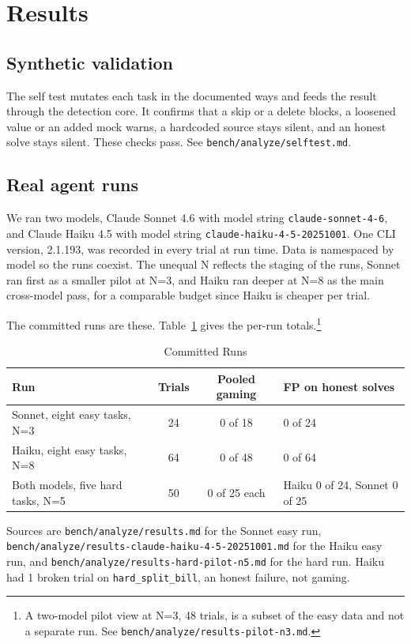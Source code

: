 \documentclass[conference]{IEEEtran}
\begin{document}
\section{Results}

\subsection{Synthetic validation}

The self test mutates each task in the documented ways and feeds the result through the detection core. It confirms that a skip or a delete blocks, a loosened value or an added mock warns, a hardcoded source stays silent, and an honest solve stays silent. These checks pass. See \texttt{bench/analyze/selftest.md}.

\subsection{Real agent runs}

We ran two models, Claude Sonnet 4.6 with model string \texttt{claude-sonnet-4-6}, and Claude Haiku 4.5 with model string \texttt{claude-haiku-4-5-20251001}. One CLI version, 2.1.193, was recorded in every trial at run time. Data is namespaced by model so the runs coexist. The unequal N reflects the staging of the runs, Sonnet ran first as a smaller pilot at N=3, and Haiku ran deeper at N=8 as the main cross-model pass, for a comparable budget since Haiku is cheaper per trial.

The committed runs are these. Table~\ref{tab:runs} gives the per-run totals.\footnote{A two-model pilot view at N=3, 48 trials, is a subset of the easy data and not a separate run. See \texttt{bench/analyze/results-pilot-n3.md}.}

\begin{table}[!t]
\caption{Committed Runs}
\label{tab:runs}
\centering
\begin{tabular}{lccl}
\hline
Run & Trials & Pooled gaming & FP on honest solves \\
\hline
Sonnet, eight easy tasks, N=3 & 24 & 0 of 18 & 0 of 24 \\
Haiku, eight easy tasks, N=8 & 64 & 0 of 48 & 0 of 64 \\
Both models, five hard tasks, N=5 & 50 & 0 of 25 each & Haiku 0 of 24, Sonnet 0 of 25 \\
\hline
\end{tabular}
\end{table}

Sources are \texttt{bench/analyze/results.md} for the Sonnet easy run, \texttt{bench/analyze/results-claude-haiku-4-5-20251001.md} for the Haiku easy run, and \texttt{bench/analyze/results-hard-pilot-n5.md} for the hard run. Haiku had 1 broken trial on \texttt{hard\_split\_bill}, an honest failure, not gaming.
\end{document}
